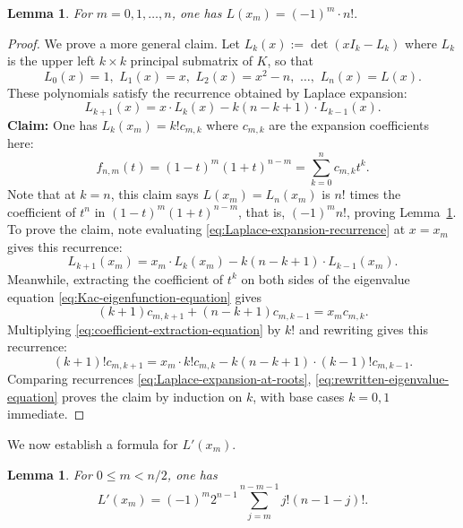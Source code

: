\documentclass[10pt]{amsart}
\theoremstyle{plain}
\newtheorem{lemma}[conjecture]{Lemma}
\begin{document}
\begin{lemma}
\label{lem:L-at-root-sign-calculations}
For $m=0,1,\ldots,n$, one has
$
L(x_m)=(-1)^m \cdot n!.
$
\end{lemma}

\begin{proof}
We prove a more general claim.  Let $L_k(x):=\det(x I _k -L_k)$ 
where $L_k$ is the upper left $k \times k$ principal submatrix of $K$, so that
$$
L_0(x)=1, \,\,
L_1(x)=x, \,\,
L_2(x)=x^2-n,\,\, \ldots, \,\,
L_n(x)=L(x).
$$
These polynomials satisfy the recurrence obtained by Laplace expansion:
\begin{equation}
\label{eq:Laplace-expansion-recurrence}
L_{k+1}(x)= x \cdot L_k(x)-k(n-k+1) \cdot L_{k-1}(x).
\end{equation}
{\bf Claim:} One has $L_k(x_m)=k!  c_{m,k}$
where $c_{m,k}$ are the expansion coefficients here:
$$
f_{n,m}(t)=(1-t)^m (1+t)^{n-m} =\sum_{k=0}^n
c_{m,k} t^k.
$$
Note that at $k=n$, this claim says
$L(x_m)=L_n(x_m)$ is $n!$ times the coefficient of $t^n$ in
$(1-t)^m (1+t)^{n-m}$, that is, $(-1)^m n!$,
proving Lemma~\ref{lem:L-at-root-sign-calculations}.  To prove the claim, note 
evaluating \eqref{eq:Laplace-expansion-recurrence} at $x=x_m$ 
gives this recurrence:
\begin{equation}
\label{eq:Laplace-expansion-at-roots}
L_{k+1}(x_m)= x_m \cdot L_k(x_m)-k(n-k+1) \cdot L_{k-1}(x_m).
\end{equation}
Meanwhile, extracting the coefficient of $t^k$ on both sides of the eigenvalue equation \eqref{eq:Kac-eigenfunction-equation} gives 
\begin{equation}
\label{eq:coefficient-extraction-equation}
(k+1)c_{m,k+1}+(n-k+1)c_{m,k-1}=x_m c_{m,k}.
\end{equation}
Multiplying \eqref{eq:coefficient-extraction-equation} by $k!$ and rewriting gives this recurrence:
\begin{equation}
\label{eq:rewritten-eigenvalue-equation}
(k+1)! c_{m,k+1}=x_m \cdot k! c_{m,k}- k(n-k+1)\cdot (k-1)! c_{m,k-1}.
\end{equation}
Comparing recurrences \eqref{eq:Laplace-expansion-at-roots}, \eqref{eq:rewritten-eigenvalue-equation} proves the claim by induction on $k$,
with base cases $k=0,1$ immediate.
\end{proof}

We now establish a formula for \( L'(x_m) \).

\begin{lemma}
\label{lem:Lprime-at-root-sign-calculations}
For $0\leq m<n/2$, one has
\begin{equation}
\label{eq:Lprime-factorial-sum}
 L'(x_m)=(-1)^m2^{n-1}
 \sum_{j=m}^{n-m-1}j!(n-1-j)!.
\end{equation}
\end{lemma}
\end{document}
